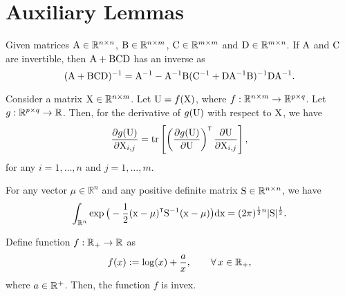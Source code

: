 \section{Auxiliary Lemmas}\label{app:auxiliary lemma}
\begin{lemma}[Matrix Inversion Lemma, %
\cite{petersen2008matrix}]
\label{lem:matrix_inversion_lemma}
Given matrices ${ \mathrm{A} } \in {\mathbb{R}}^{n\times n}$, ${ \mathrm{B} } \in {\mathbb{R}}^{n\times m}$, ${ \mathrm{C} } \in {\mathbb{R}}^{m\times m}$ and ${ \mathrm{D} } \in {\mathbb{R}}^{m\times n}$. If ${ \mathrm{A} }$ and ${ \mathrm{C} }$ are invertible, then ${ \mathrm{A} }+{ \mathrm{B} }{ \mathrm{C} }{ \mathrm{D} }$ has an inverse as
\begin{equation}\label{eq:matrix inversion lemma}
    ({ \mathrm{A} }+{ \mathrm{B} }{ \mathrm{C} }{ \mathrm{D} })^{-1} = { \mathrm{A} }^{-1} -{ \mathrm{A} }^{-1}{ \mathrm{B} }({ \mathrm{C} }^{-1} + { \mathrm{D} }{ \mathrm{A} }^{-1}{ \mathrm{B} })^{-1}{ \mathrm{D} }{ \mathrm{A} }^{-1}.
\end{equation}
\end{lemma}
\begin{lemma} 
\label{lem:chain_rule}
Consider a matrix ${ \mathrm{X} } \in {\mathbb{R}}^{n\times m}$. Let ${ \mathrm{U} } = f({ \mathrm{X} })$,
where $f:{\mathbb{R}}^{n\times m}\to{\mathbb{R}}^{p \times q}$. Let $g:{\mathbb{R}}^{p\times q}\to{\mathbb{R}}$. Then, for the derivative of $g({ \mathrm{U} })$ with respect to ${ \mathrm{X} }$, we have
\begin{equation}\label{eq:chain rule}
    \pdv{g(\mxU)}{\mxX_{i,j}} = \trace\left[\left(\pdv{g(\mxU)}{\mxU}\right)^\tr \pdv{\mxU}{\mxX_{i,j}} \right],
\end{equation}
for any $i=1,\ldots,n$ and $j=1,\ldots,m$.
\end{lemma}
\begin{lemma}  
\label{lem:Gaussian_integration}
For any vector $\mu\in \mathbb{R}^{n}$ and any positive definite matrix ${ \mathrm{S} } \in \mathbb{R}^{n \times n}$, we have
\begin{equation}\label{eq:Gaussian integration}
    \int_{\mathbb{R}^{n}} 
    \exp\big(-\frac{1}{2} 
        (\vcx - \mu)^\tr\mxS^{-1} (\vcx - \mu) 
        \big) 
    \drm \vcx 
    = 
    (2\pi)^{\frac{1}{2}n}|\mxS|^{\frac{1}{2}}.
\end{equation}
\end{lemma}
\begin{lemma}\label{lem:invex}
    Define function $f:{\mathbb{R}}_+\to {\mathbb{R}}$ as    
    \begin{equation}
        f(x) := \log(x) + \frac{a}{x}, \qquad \forall\, x\in{\mathbb{R}}_+,
    \end{equation}
    where $a\in{\mathbb{R}}^+$. Then, the function $f$ is invex.
\end{lemma}
